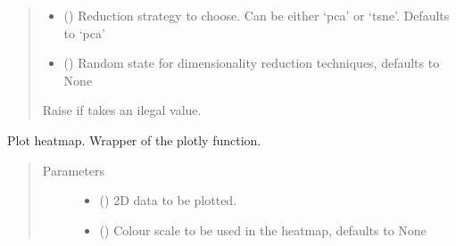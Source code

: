 \documentclass[letterpaper,10pt,english]{sphinxmanual}
\begin{document}
\begin{fulllineitems}
\begin{quote}
\begin{description}
\begin{itemize}
\item {} 
 (\sphinxstyleliteralemphasis{\sphinxupquote{, }}) \textendash{} Reduction strategy to choose. Can be either
‘pca’ or ‘tsne’. Defaults to ‘pca’

\item {} 
 (\sphinxstyleliteralemphasis{\sphinxupquote{, }}) \textendash{} Random state for dimensionality reduction techniques,
defaults to None

\end{itemize}

\item[{Raises}] \leavevmode
{} \textendash{} Raise  if  takes an
ilegal value.

\end{description}\end{quote}

\end{fulllineitems}


\begin{fulllineitems}
\label{\detokenize{code:code_utils.plotter.plot_heatmap}}
Plot heatmap. Wrapper of the plotly  function.
\begin{quote}\begin{description}
\item[{Parameters}] \leavevmode\begin{itemize}
\item {} 
 () \textendash{} 2D data to be plotted.

\item {} 
 (\sphinxstyleliteralemphasis{\sphinxupquote{, }}) \textendash{} Colour scale to be used in the heatmap,
defaults to None

\end{itemize}

\end{description}\end{quote}

\end{fulllineitems}
\end{document}

